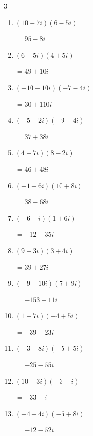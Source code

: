 \begin{multicols}{3}
\begin{enumerate}
        $\displaystyle =-57+24i$

  \item $\displaystyle (10+7i)(6-5i)$

        $\displaystyle =95-8i$

  \item $\displaystyle (6-5i)(4+5i)$

        $\displaystyle =49+10i$

  \item $\displaystyle (-10-10i)(-7-4i)$

        $\displaystyle =30+110i$

  \item $\displaystyle (-5-2i)(-9-4i)$

        $\displaystyle =37+38i$

  \item $\displaystyle (4+7i)(8-2i)$

        $\displaystyle =46+48i$

  \item $\displaystyle (-1-6i)(10+8i)$

        $\displaystyle =38-68i$

  \item $\displaystyle (-6+i)(1+6i)$

        $\displaystyle =-12-35i$

  \item $\displaystyle (9-3i)(3+4i)$

        $\displaystyle =39+27i$

  \item $\displaystyle (-9+10i)(7+9i)$

        $\displaystyle =-153-11i$

  \item $\displaystyle (1+7i)(-4+5i)$

        $\displaystyle =-39-23i$

  \item $\displaystyle (-3+8i)(-5+5i)$

        $\displaystyle =-25-55i$

  \item $\displaystyle (10-3i)(-3-i)$

        $\displaystyle =-33-i$

  \item $\displaystyle (-4+4i)(-5+8i)$

        $\displaystyle =-12-52i$

\columnbreak %


\end{enumerate}
\end{multicols}
